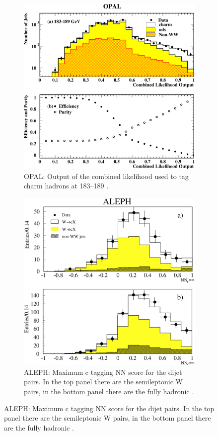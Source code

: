 \begin{figure}[H]
    \begin{subfigure}{0.48\linewidth}
        \centering
         \includegraphics[width=\linewidth]{fig//chap02-theory/opal.png}
         \caption{OPAL: Output of the combined likelihood used to tag charm hadrons at 183–189 \GeV\cite{Abbiendi2000ADecays}.\\}
    \end{subfigure}
     \hfill
     \begin{subfigure}{0.475\linewidth}
         \centering
        \includegraphics[width=\linewidth]{fig//chap02-theory/aleph.png}
         \caption{ALEPH: Maximum c tagging NN score for the dijet pairs. In the top panel there are the semileptonic W pairs, in the bottom panel there are the fully hadronic \cite{Barate1999ATag}.}
     \end{subfigure}
        \label{fig:rc_lep}
\end{figure}
